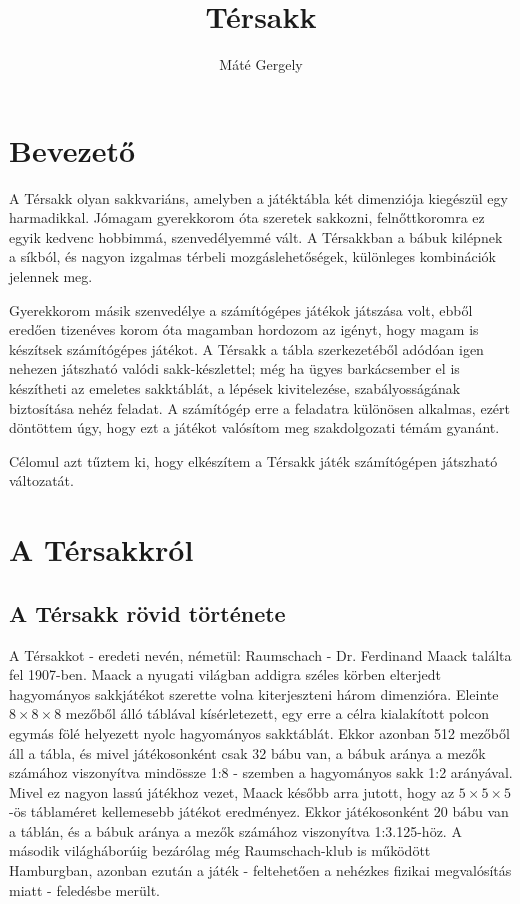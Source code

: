 \documentclass[12pt, twoside]{report}
\title{Térsakk}
\author{Máté Gergely}
\begin{document}
\maketitle
\tableofcontents

\chapter{Bevezető}

A Térsakk olyan sakkvariáns, amelyben a játéktábla két dimenziója kiegészül egy harmadikkal. Jómagam gyerekkorom óta szeretek sakkozni, felnőttkoromra ez egyik kedvenc hobbimmá, szenvedélyemmé vált. A Térsakkban a bábuk kilépnek a síkból, és nagyon izgalmas térbeli mozgáslehetőségek, különleges kombinációk jelennek meg. 

Gyerekkorom másik szenvedélye a számítógépes játékok játszása volt, ebből eredően tizenéves korom óta magamban hordozom az igényt, hogy magam is készítsek számítógépes játékot. A Térsakk a tábla szerkezetéből adódóan igen nehezen játszható valódi sakk-készlettel; még ha ügyes barkácsember el is készítheti az emeletes sakktáblát, a lépések kivitelezése, szabályosságának biztosítása nehéz feladat. A számítógép erre a feladatra különösen alkalmas, ezért döntöttem úgy, hogy ezt a játékot valósítom meg szakdolgozati témám gyanánt.

Célomul azt tűztem ki, hogy elkészítem a Térsakk játék számítógépen játszható változatát. 

\chapter {A Térsakkról}

\section{A Térsakk rövid története}
A Térsakkot - eredeti nevén, németül: Raumschach - Dr. Ferdinand Maack találta fel 1907-ben. Maack a nyugati világban addigra széles körben elterjedt hagyományos sakkjátékot szerette volna kiterjeszteni három dimenzióra. Eleinte $ 8 \times 8 \times 8 $ mezőből álló táblával kísérletezett, egy erre a célra kialakított polcon egymás fölé helyezett nyolc hagyományos sakktáblát. Ekkor azonban 512 mezőből áll a tábla, és mivel játékosonként csak 32 bábu van, a bábuk aránya a mezők számához viszonyítva mindössze 1:8 - szemben a hagyományos sakk 1:2 arányával. Mivel ez nagyon lassú játékhoz vezet, Maack később arra jutott, hogy az $ 5 \times 5 \times 5 $-ös táblaméret kellemesebb játékot eredményez. Ekkor játékosonként 20 bábu van a táblán, és a bábuk aránya a mezők számához viszonyítva 1:3.125-höz. A második világháborúig bezárólag még Raumschach-klub is működött Hamburgban, azonban ezután a játék - feltehetően a nehézkes fizikai megvalósítás miatt - feledésbe merült.
\end{document}
